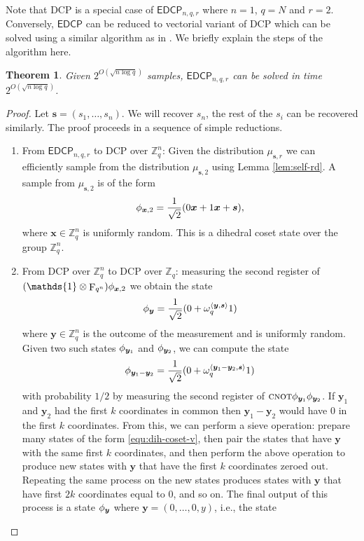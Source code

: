 \documentclass[11pt]{article}
\theoremstyle{plain}
\newtheorem{theorem}{Theorem}
\theoremstyle{definition}
\DeclareMathOperator{\qft}{F}
\let\ket\relax
\DeclarePairedDelimiter{\ket}{\lvert}{\rangle}
\DeclarePairedDelimiter{\lrang}{\langle}{\rangle}
\def\Z{\mathbb{Z}}
\def\edcp{\mathsf{EDCP}}
\begin{document}
Note that DCP is a special case of $\edcp_{n, q, r}$ where $n = 1$, $q = N$ and $r = 2$. Conversely, $\edcp$ can be reduced to vectorial variant of DCP which can be solved using a similar algorithm as in \cite{kuperberg2005subexponential}. We briefly explain the steps of the algorithm here.
\begin{theorem}
    \label{thm:subexp-smpl}
    Given $2^{O(\sqrt{n\log q})}$ samples, $\edcp_{n, q, r}$ can be solved in time $2^{O(\sqrt{n\log q})}$.
\end{theorem}
\begin{proof}
    Let $\bm{s} = (s_1, \dots, s_n)$. We will recover $s_n$, the rest of the $s_i$ can be recovered similarly. The proof proceeds in a sequence of simple reductions.
    \begin{enumerate}[leftmargin = *, font = \bfseries]
    \item From $\edcp_{n, q, r}$ to DCP over $\Z_q^n$: Given the distribution $\mu_{\bm{s}, r}$ we can efficiently sample from the distribution $\mu_{\bm{s}, 2}$ using Lemma \ref{lem:self-rd}. A sample from $\mu_{\bm{s}, 2}$ is of the form
    \[ \ket{\phi_{\bm{x}, 2}} = \frac{1}{\sqrt{2}}(\ket{0}\ket{\bm{x}} + \ket{1}\ket{\bm{x} + \bm{s}}), \]
    where $\bm{x} \in \Z_q^n$ is uniformly random. This is a dihedral coset state over the group $\Z_q^n$.
    \item From DCP over $\Z_q^n$ to DCP over $\Z_q$: measuring the second register of $(\mathds{1} \otimes \qft_{q^n}) \ket{\phi_{\bm{x}, 2}}$ we obtain the state
    \begin{equation}
        \label{equ:dih-coset-v}
        \ket{\phi_{\bm{y}}} = \frac{1}{\sqrt{2}}(\ket{0} + \omega_q^{\lrang{\bm{y}, \bm{s}}}\ket{1})
    \end{equation}
    where $\bm{y} \in \Z_q^n$ is the outcome of the measurement and is uniformly random. Given two such states $\ket{\phi_{\bm{y}_1}}$ and $\ket{\phi_{\bm{y}_2}}$, we can compute the state
    \[ \ket{\phi_{\bm{y}_1 - \bm{y}_2}} = \frac{1}{\sqrt{2}}(\ket{0} + \omega_q^{\lrang{\bm{y}_1 - \bm{y}_2, \bm{s}}}\ket{1}) \]
    with probability $1 / 2$ by measuring the second register of $\textsc{cnot} \ket{\phi_{\bm{y}_1}} \ket{\phi_{\bm{y}_2}}$. If $\bm{y}_1$ and $\bm{y}_2$ had the first $k$ coordinates in common then $\bm{y}_1 - \bm{y}_2$ would have $0$ in the first $k$ coordinates. From this, we can perform a sieve operation: prepare many states of the form \eqref{equ:dih-coset-v}, then pair the states that have $\bm{y}$ with the same first $k$ coordinates, and then perform the above operation to produce new states with $\bm{y}$ that have the first $k$ coordinates zeroed out. Repeating the same process on the new states produces states with $\bm{y}$ that have first $2k$ coordinates equal to $0$, and so on. The final output of this process is a state $\ket{\phi_{\bm{y}}}$ where $\bm{y} = (0, \dots, 0, y)$, i.e., the state

\end{enumerate}
\end{proof}
\end{document}
